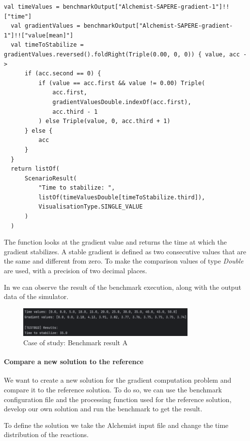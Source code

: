 \documentclass[12pt,a4paper,openright,twoside]{book}
\begin{document}
\begin{lstlisting}[style=my-kotlin, language=my-kotlin, caption={Case of study: Output processing function.}]
  val timeValues = benchmarkOutput["Alchemist-SAPERE-gradient-1"]!!["time"]
  val gradientValues = benchmarkOutput["Alchemist-SAPERE-gradient-1"]!!["value[mean]"]
  val timeToStabilize = gradientValues.reversed().foldRight(Triple(0.00, 0, 0)) { value, acc ->
      if (acc.second == 0) {
          if (value == acc.first && value != 0.00) Triple(
              acc.first,
              gradientValuesDouble.indexOf(acc.first),
              acc.third - 1
          ) else Triple(value, 0, acc.third + 1)
      } else {
          acc
      }
  }
  return listOf(
      ScenarioResult(
          "Time to stabilize: ",
          listOf(timeValuesDouble[timeToStabilize.third]),
          VisualisationType.SINGLE_VALUE
      )
  )
\end{lstlisting}

The function looks at the gradient value and returns the time at which the gradient stabilizes.
A stable gradient is defined as two consecutive values that are the same and different from zero.
To make the comparison values of type \textit{Double} are used, with a precision of two decimal places.

In  we can observe the result of the benchmark execution, along with the output data of the simulator.

\begin{figure}[h!]
  \centering
  \includegraphics[width=0.8\textwidth]{figures/result-A.png}
  \caption{Case of study: Benchmark result A}
  \label{fig:result-A}
\end{figure}

\paragraph*{Compare a new solution to the reference}

We want to create a new solution for the gradient computation problem and compare it to the reference solution.
To do so, we can use the benchmark configuration file and the processing function used for the reference solution,
develop our own solution and run the benchmark to get the result.

To define the solution we take the Alchemist input file and change the time distribution of the reactions.
\end{document}
